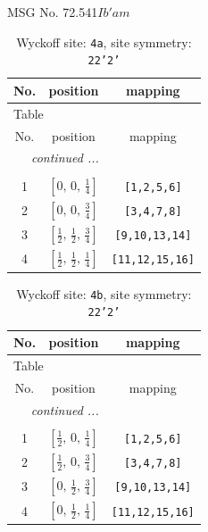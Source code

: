 \documentclass[fleqn,8pt]{jsarticle}
\begin{document}
\setcounter{MaxMatrixCols}{32}

\renewcommand{\tablename}{Table~}
\renewcommand{\figurename}{Figure~}
\begin{center}
\LARGE
MSG No. 72.541\quad$Ib'am$
\end{center}
\renewcommand{\arraystretch}{1.2}
\begin{longtable}{ccc}
\caption{Wyckoff site: {\tt 4a}, site symmetry: {\tt 22'2'}}
 \\
 \hline \hline
No. & position & mapping \\ \hline \endfirsthead

\multicolumn{2}{l}{\tablename\ \thetable{}} \\
 \hline \hline
No. & position & mapping \\ \hline \endhead

 \hline \hline
\multicolumn{2}{r}{\footnotesize\it continued ...} \\ \endfoot

 \hline \hline
\multicolumn{2}{r}{} \\ \endlastfoot

1 & $\left[ 0,\, 0,\, \frac{1}{4} \right]$ & {\tt [1,2,5,6]} \\ \hline
2 & $\left[ 0,\, 0,\, \frac{3}{4} \right]$ & {\tt [3,4,7,8]} \\ \hline
3 & $\left[ \frac{1}{2},\, \frac{1}{2},\, \frac{3}{4} \right]$ & {\tt [9,10,13,14]} \\ \hline
4 & $\left[ \frac{1}{2},\, \frac{1}{2},\, \frac{1}{4} \right]$ & {\tt [11,12,15,16]} \\
\end{longtable}
\renewcommand{\arraystretch}{1.2}
\begin{longtable}{ccc}
\caption{Wyckoff site: {\tt 4b}, site symmetry: {\tt 22'2'}}
 \\
 \hline \hline
No. & position & mapping \\ \hline \endfirsthead

\multicolumn{2}{l}{\tablename\ \thetable{}} \\
 \hline \hline
No. & position & mapping \\ \hline \endhead

 \hline \hline
\multicolumn{2}{r}{\footnotesize\it continued ...} \\ \endfoot

 \hline \hline
\multicolumn{2}{r}{} \\ \endlastfoot

1 & $\left[ \frac{1}{2},\, 0,\, \frac{1}{4} \right]$ & {\tt [1,2,5,6]} \\ \hline
2 & $\left[ \frac{1}{2},\, 0,\, \frac{3}{4} \right]$ & {\tt [3,4,7,8]} \\ \hline
3 & $\left[ 0,\, \frac{1}{2},\, \frac{3}{4} \right]$ & {\tt [9,10,13,14]} \\ \hline
4 & $\left[ 0,\, \frac{1}{2},\, \frac{1}{4} \right]$ & {\tt [11,12,15,16]} \\
\end{longtable}
\end{document}
